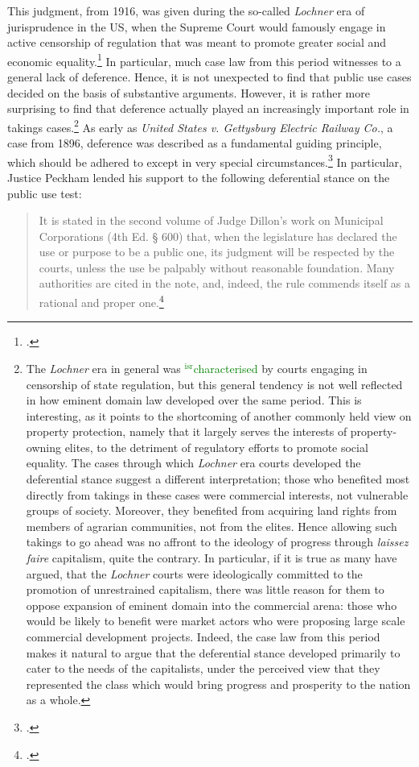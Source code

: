 \documentclass[12pt,a4paper]{book} %
\newcommand{\isr}[1]{\textcolor{green}{$^{\textrm{isr}}${#1}}}
\begin{document}
This judgment, from 1916, was given during the so-called {\it Lochner} era of jurisprudence in the US, when the Supreme Court  would famously engage in active censorship of regulation that was meant to promote greater social and economic equality.\footcite{cohen08} In particular, much case law from this period witnesses to a general lack of deference. Hence, it is not unexpected to find that public use cases decided on the basis of substantive arguments. However, it is rather more surprising to find that deference actually played an increasingly important role in takings cases.\footnote{The {\it Lochner} era in general was \isr{characterised} by courts engaging in censorship of state regulation, but this general tendency is not well reflected in how eminent domain law developed over the same period. This is interesting, as it points to the shortcoming of another commonly held view on property protection, namely that it largely serves the interests of property-owning elites, to the detriment of regulatory efforts to promote social equality. The cases through which {\it Lochner} era courts developed the deferential stance suggest a different interpretation; those who benefited most directly from takings in these cases were commercial interests, not vulnerable groups of society. Moreover, they benefited from acquiring land rights from members of agrarian communities, not from the elites. Hence allowing such takings to go ahead was no affront to the ideology of progress through {\it laissez faire} capitalism, quite the contrary. In particular, if it is true as many have argued, that the {\it Lochner} courts were ideologically committed to the promotion of unrestrained capitalism, there was little reason for them to oppose expansion of eminent domain into the commercial arena: those who would be likely to benefit were market actors who were proposing large scale commercial development projects. Indeed, the case law from this period makes it natural to argue that the deferential stance developed primarily to cater to the needs of the capitalists, under the perceived view that they represented the class which would bring progress and prosperity to the nation as a whole.} As early as { \it United States v. Gettysburg Electric Railway Co.}, a case from 1896, deference was described as a fundamental guiding principle, which should be adhered to except in very special circumstances.\footcite{gettysburg96} In particular, Justice Peckham lended his support to the following deferential stance on the public use test:

\begin{quote}
It is stated in the second volume of Judge Dillon's work on Municipal Corporations (4th Ed. § 600) that, when the legislature has declared the use or purpose to be a public one, its judgment will be respected by the courts, unless the use be palpably without reasonable foundation. Many authorities are cited in the note, and, indeed, the rule commends itself as a rational and proper one.\footcite[680]{gettysburg96}
\end{quote}
\end{document}
